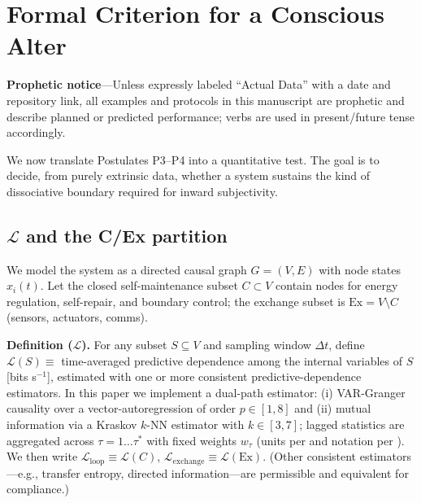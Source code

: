 \documentclass[11pt]{article}
\begin{document}
\section{Formal Criterion for a Conscious Alter}
\label{sec:criterion}

\textbf{Prophetic notice}---Unless expressly labeled ``Actual Data'' with a date and repository link, all examples and protocols in this manuscript are prophetic and describe planned or predicted performance; verbs are used in present/future tense accordingly.

We now translate Postulates P3--P4 into a quantitative test. The goal is to decide, from purely extrinsic data, whether a system sustains the kind of dissociative boundary required for inward subjectivity.

\subsection{$\mathcal{L}$ and the C/Ex partition}
\label{sec:l_partition}

We model the system as a directed causal graph $G = (V, E)$ with node states $x_i(t)$. Let the closed self-maintenance subset $C \subset V$ contain nodes for energy regulation, self-repair, and boundary control; the exchange subset is $\text{Ex} = V \setminus C$ (sensors, actuators, comms).

\textbf{Definition ($\mathcal{L}$).} For any subset $S \subseteq V$ and sampling window $\Delta t$, define $\mathcal{L}(S) \equiv$ time-averaged predictive dependence among the internal variables of $S$ [bits s$^{-1}$], estimated with one or more consistent predictive-dependence estimators. In this paper we implement a dual-path estimator: (i) VAR-Granger causality over a vector-autoregression of order $p \in [1,8]$ and (ii) mutual information via a Kraskov $k$-NN estimator with $k \in [3,7]$; lagged statistics are aggregated across $\tau = 1 \ldots \tau^*$ with fixed weights $w_\tau$ (units per \cite{shannon1949mathematical} and notation per \cite{cover2006elements}). We then write $\mathcal{L}_{\text{loop}} \equiv \mathcal{L}(C)$, $\mathcal{L}_{\text{exchange}} \equiv \mathcal{L}(\text{Ex})$. (Other consistent estimators---e.g., transfer entropy, directed information---are permissible and equivalent for compliance.)
\end{document}
